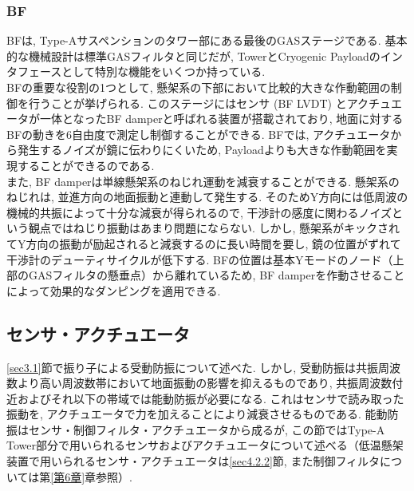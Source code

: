 \subsubsection{BF}
\vskip3mm
BFは, Type-Aサスペンションのタワー部にある最後のGASステージである. 基本的な機械設計は標準GASフィルタと同じだが, TowerとCryogenic Payloadのインタフェースとして特別な機能をいくつか持っている. \\
\quad BFの重要な役割の1つとして, 懸架系の下部において比較的大きな作動範囲の制御を行うことが挙げられる. このステージにはセンサ (BF LVDT) とアクチュエータが一体となったBF damperと呼ばれる装置が搭載されており, 地面に対するBFの動きを6自由度で測定し制御することができる. BFでは, アクチュエータから発生するノイズが鏡に伝わりにくいため, Payloadよりも大きな作動範囲を実現することができるのである. \\
\quad また, BF damperは単線懸架系のねじれ運動を減衰することができる. 懸架系のねじれは, 並進方向の地面振動と連動して発生する. そのためY方向には低周波の機械的共振によって十分な減衰が得られるので, 干渉計の感度に関わるノイズという観点ではねじり振動はあまり問題にならない. しかし, 懸架系がキックされてY方向の振動が励起されると減衰するのに長い時間を要し, 鏡の位置がずれて干渉計のデューティサイクルが低下する. BFの位置は基本Yモードのノード（上部のGASフィルタの懸垂点）から離れているため, BF damperを作動させることによって効果的なダンピングを適用できる. 
\subsection{センサ・アクチュエータ}
\ref{sec3.1}節で振り子による受動防振について述べた. しかし, 受動防振は共振周波数より高い周波数帯において地面振動の影響を抑えるものであり, 共振周波数付近およびそれ以下の帯域では能動防振が必要になる. これはセンサで読み取った振動を, アクチュエータで力を加えることにより減衰させるものである. 能動防振はセンサ・制御フィルタ・アクチュエータから成るが, この節ではType-A Tower部分で用いられるセンサおよびアクチュエータについて述べる（低温懸架装置で用いられるセンサ・アクチュエータは\ref{sec4.2.2}節, また制御フィルタについては第\ref{第6章}章参照）. 
